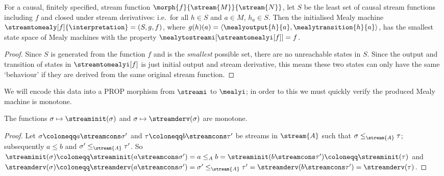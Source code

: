 \begin{corollary}\label{cor:minimal-mealy}
    For a causal, finitely specified, stream function \(
    \morph{f}{\stream{M}}{\stream{N}}
    \), let \(S\) be the least set of
    causal stream functions including \(f\) and closed under stream derivatives:
    i.e.\ for all \(h \in S\) and \(a \in M\), \(h_a \in S\).
    Then the initialised Mealy machine \(
    \streamtomealy[f]{\interpretation} = (S, g, f)
    \), where \(
    g(h)(a) = \langle \mealyoutput{h}{a}, \mealytransition{h}{a}\rangle
    \), has the smallest state space of Mealy machines with the property \(
    \mealytostreami[\streamtomealyi[f]] = f
    \).
\end{corollary}
\begin{proof}
    Since \(S\) is generated from the function \(f\) and is the \emph{smallest}
    possible set, there are no unreachable states in \(S\).
    Since the output and transition of states in
    \(\streamtomealyi[f]\) is just initial output and stream derivative, this
    means these two states can only have the same `behaviour' if they are
    derived from the same original stream function.
\end{proof}

We will encode this data into a PROP morphism from \(\streami\) to \(\mealyi\);
in order to this we must quickly verify the produced Mealy machine is monotone.

\begin{lemma}\label{lem:head-tail-monotone}
    The functions \(\sigma \mapsto \streaminit(\sigma)\) and
    \(\sigma \mapsto \streamderv(\sigma)\) are monotone.
\end{lemma}
\begin{proof}
    Let \(\sigma \coloneqq a \streamcons \sigma^\prime\) and
    \(\tau \coloneqq b \streamcons \tau^\prime\) be streams in \(\stream{A}\)
    such that \(\sigma \leq_{\stream{A}} \tau\); subsequently \(a \leq b\) and
    \(\sigma^\prime \leq_{\stream{A}} \tau^\prime\).
    So \(
    \streaminit(\sigma) \coloneqq
    \streaminit(a \streamcons \sigma^\prime) =
    a \leq_{A}
    b =
    \streaminit(b \streamcons \tau^\prime) \coloneqq
    \streaminit(\tau)
    \) and \(
    \streamderv(\sigma) \coloneqq
    \streamderv(a \streamcons \sigma^\prime) =
    \sigma^\prime \leq_{\stream{A}}
    \tau^\prime =
    \streamderv(b \streamcons \tau^\prime) =
    \streamderv(\tau)
    \).
\end{proof}

